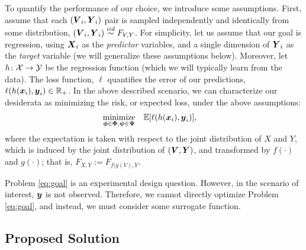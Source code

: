 \documentclass{article}
\begin{document}
To quantify the performance of our choice, we introduce some assumptions.  First, assume that each $(\boldsymbol{V}_i,\boldsymbol{Y}_i)$ pair is sampled independently and identically from some distribution, $(\boldsymbol{V}_i,\boldsymbol{Y}_i) \overset{iid}{\sim} F_{V,Y}$.  For simplicity, let us assume that our goal is regression, using $\boldsymbol{X}_i$ as the \emph{predictor} variables, and a single dimension of $\boldsymbol{Y}_i$ as the \emph{target} variable (we will generalize these assumptions below).  Moreover, let $h {\colon} \mathcal{X} \to \mathcal{Y}$ be the regression function (which we will typically learn from the data).  The loss function, $\ell$ quantifies the error of our predictions, $\ell( h(\boldsymbol{x}_i), \boldsymbol{y}_i) \in \mathbb{R}_+$.  
In the above described scenario, we can characterize our desiderata as minimizing the risk, or expected loss, under the above assumptions:
\begin{equation} \label{eq:goal}
\begin{aligned}
& \underset{\boldsymbol{\phi} \in \boldsymbol{\Phi},\boldsymbol{\psi} \in \boldsymbol{\Psi}}{\text{minimize}}
& & \mathbb{E} [ \ell( h (\boldsymbol{x}_i), \boldsymbol{y}_i)],
\end{aligned}
\end{equation}
where the expectation is taken with respect to the joint distribution of $X$ and $Y$, which is induced by the joint distribution of $(\boldsymbol{V},\boldsymbol{Y})$, and transformed by $f(\cdot)$ and $g(\cdot)$; that is, $F_{X,Y}:=F_{f(g(V),Y}$.

Problem \eqref{eq:goal} is an experimental design question.  However, in the scenario of interest, $\boldsymbol{y}$ is not observed.  Therefore, we cannot directly optimize Problem \eqref{eq:goal}, and instead, we must consider some surrogate function.  

\subsection{Proposed Solution}
\end{document}
